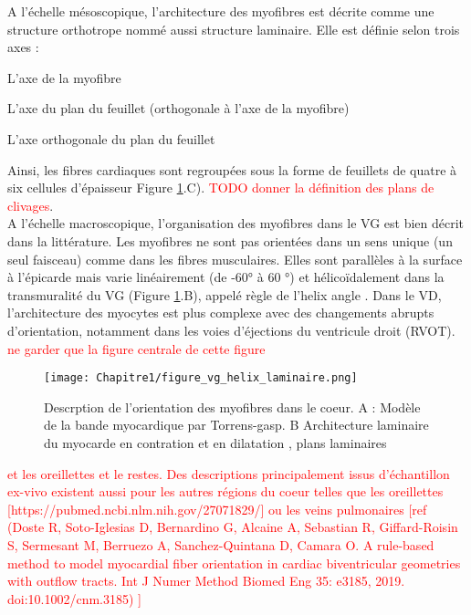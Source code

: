 A l’échelle mésoscopique, l’architecture des myofibres est décrite comme une structure orthotrope nommé aussi structure laminaire\cite{NiellesVallespin2019}. Elle est définie selon trois axes : 

\begin{bulletList}
 \item L’axe de la myofibre
 \item L’axe du plan du feuillet (orthogonale à l’axe de la myofibre)
 \item L’axe orthogonale du plan du feuillet
\end{bulletList}

Ainsi, les fibres cardiaques sont regroupées sous la forme de feuillets de quatre à six cellules d’épaisseur Figure \ref{fig:model_fibre}.C). \textcolor{red}{TODO donner la définition des plans de clivages}.\\

A l'échelle macroscopique, l’organisation des myofibres dans le VG est bien décrit dans la littérature. Les myofibres ne sont pas orientées dans un sens unique (un seul faisceau) comme dans les fibres musculaires. Elles sont parallèles à la surface à l’épicarde mais varie linéairement (de -60° à 60 °) et hélicoïdalement dans la transmuralité du VG (Figure \ref{fig:model_fibre}.B), appelé règle de l’helix angle \cite{NiellesVallespin2019} \cite{STREETER1969}. Dans le VD, l’architecture des myocytes est plus complexe \cite{Vetter2005} avec des changements abrupts d’orientation, notamment dans les voies d’éjections du ventricule droit (RVOT).\\

\textcolor{red}{ne garder que la figure centrale de cette figure}
\begin{figure}[!h]
  \begin{center}
    \texttt{[image: Chapitre1/figure\_vg\_helix\_laminaire.png]}
  \end{center}
  \caption{Descrption de l'orientation des myofibres dans le coeur. A : Modèle de la bande myocardique par Torrens-gasp. B Architecture laminaire du myocarde en contration et en dilatation \cite{NiellesVallespin2019}, plans laminaires \cite{Khalique_2020}}
  \label{fig:model_fibre}
\end{figure}


\textcolor{red}{et les oreillettes et le restes. Des descriptions principalement issus d'échantillon ex-vivo existent aussi pour les autres régions du coeur telles que les oreillettes [https://pubmed.ncbi.nlm.nih.gov/27071829/] ou les veins pulmonaires [ref (Doste R, Soto-Iglesias D, Bernardino G, Alcaine A, Sebastian R, Giffard-Roisin S, Sermesant M, Berruezo A, Sanchez-Quintana D, Camara O. A rule-based method to model myocardial fiber orientation in cardiac biventricular geometries with outflow tracts. Int J Numer Method Biomed Eng 35: e3185, 2019. doi:10.1002/cnm.3185) ]} \\

